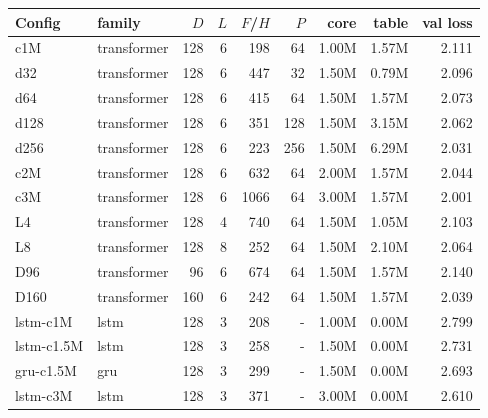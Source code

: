 \begin{tabular}{llrrrrrrr}\hline
Config & family & $D$ & $L$ & $F$/$H$ & $P$ & core & table & val loss\\\hline
c1M & transformer & 128 & 6 & 198 & 64 & 1.00M & 1.57M & 2.111\\
d32 & transformer & 128 & 6 & 447 & 32 & 1.50M & 0.79M & 2.096\\
d64 & transformer & 128 & 6 & 415 & 64 & 1.50M & 1.57M & 2.073\\
d128 & transformer & 128 & 6 & 351 & 128 & 1.50M & 3.15M & 2.062\\
d256 & transformer & 128 & 6 & 223 & 256 & 1.50M & 6.29M & 2.031\\
c2M & transformer & 128 & 6 & 632 & 64 & 2.00M & 1.57M & 2.044\\
c3M & transformer & 128 & 6 & 1066 & 64 & 3.00M & 1.57M & 2.001\\
L4 & transformer & 128 & 4 & 740 & 64 & 1.50M & 1.05M & 2.103\\
L8 & transformer & 128 & 8 & 252 & 64 & 1.50M & 2.10M & 2.064\\
D96 & transformer & 96 & 6 & 674 & 64 & 1.50M & 1.57M & 2.140\\
D160 & transformer & 160 & 6 & 242 & 64 & 1.50M & 1.57M & 2.039\\
lstm-c1M & lstm & 128 & 3 & 208 & - & 1.00M & 0.00M & 2.799\\
lstm-c1.5M & lstm & 128 & 3 & 258 & - & 1.50M & 0.00M & 2.731\\
gru-c1.5M & gru & 128 & 3 & 299 & - & 1.50M & 0.00M & 2.693\\
lstm-c3M & lstm & 128 & 3 & 371 & - & 3.00M & 0.00M & 2.610\\
\hline\end{tabular}


